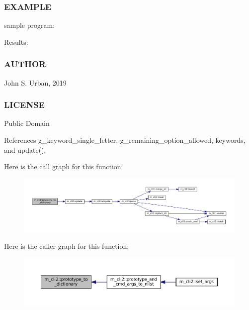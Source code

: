 \subsubsection*{E\+X\+A\+M\+P\+LE}

sample program\+: \begin{DoxyVerb}Results:
\end{DoxyVerb}


\subsubsection*{A\+U\+T\+H\+OR}

John S. Urban, 2019 \subsubsection*{L\+I\+C\+E\+N\+SE}

Public Domain 

References g\+\_\+keyword\+\_\+single\+\_\+letter, g\+\_\+remaining\+\_\+option\+\_\+allowed, keywords, and update().

Here is the call graph for this function\+:
\nopagebreak
\begin{figure}[H]
\begin{center}
\leavevmode
\includegraphics[width=350pt]{namespacem__cli2_a14896d00e509cbc32f4df993a8d6f75b_cgraph}
\end{center}
\end{figure}
Here is the caller graph for this function\+:
\nopagebreak
\begin{figure}[H]
\begin{center}
\leavevmode
\includegraphics[width=350pt]{namespacem__cli2_a14896d00e509cbc32f4df993a8d6f75b_icgraph}
\end{center}
\end{figure}
\mbox{\label{namespacem__cli2_a63f81a2c027eb5f3e0a77167ac29fc73}} 
